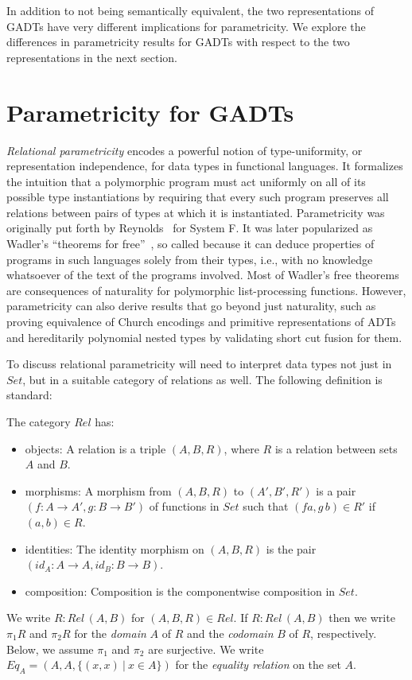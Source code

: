 \documentclass[acmsmall,screen,review,anonymous]{acmart}
\theoremstyle{definition}
\begin{document}
In addition to not being semantically equivalent, the two
representations of GADTs have very different implications for
parametricity. We explore the differences in parametricity results for
GADTs with respect to the two representations in the next section.

\section{Parametricity for GADTs}\label{sec:par}

{\em Relational parametricity} encodes a powerful notion of
type-uniformity, or representation independence, for data types in
functional languages. It formalizes the intuition that a polymorphic
program must act uniformly on all of its possible type instantiations
by requiring that every such program preserves all relations between
pairs of types at which it is instantiated. Parametricity was
originally put forth by Reynolds~\cite{rey83} for System F. It was
later popularized as Wadler's ``theorems for free''~\cite{wad89}, so
called because it can deduce properties of programs in such languages
solely from their types, i.e., with no knowledge whatsoever of the
text of the programs involved.  Most of Wadler's free theorems are
consequences of naturality for polymorphic list-processing
functions. However, parametricity can also derive results that go
beyond just naturality, such as proving equivalence of Church
encodings and primitive representations of ADTs and {\color{blue}
  hereditarily polynomial} nested types by validating short cut fusion
for them.

To discuss relational parametricity will need to interpret data types
not just in $\mathit{Set}$, but in a suitable category of relations as
well. The following definition is standard:
\begin{definition}
  The category $\mathit{Rel}$ has:
  \begin{itemize}
\item objects: A relation is a triple $(A,B,R)$, where $R$ is a
  relation between sets $A$ and $B$.
\item morphisms: A morphism from $(A,B,R)$ to $(A',B',R')$ is a pair
  $(f : A \to A',g : B \to B')$ of functions in $\mathit{Set}$ such
  that $(f a,g\,b) \in R'$ if $(a,b) \in R$.
\item identities: The identity morphism on $(A,B,R)$ is the pair
  $(\mathit{id}_A : A \to A, \mathit{id}_B : B \to B)$.
\item composition: Composition is the componentwise composition in
  $\mathit{Set}$. 
\end{itemize}
\end{definition}
\noindent
We write $R : \mathit{Rel}\,(A,B)$ for $(A,B,R) \in \mathit{Rel}$.  If
$R : \mathit{Rel}\,(A,B)$ then we write $\pi_1 R$ and $\pi_2 R$ for
the {\em domain} $A$ of $R$ and the {\em codomain} $B$ of $R$,
respectively. Below, we assume $\pi_1$ and $\pi_2$ are surjective.  We
write $\mathit{Eq}_A = (A,A,\{(x,x)~|~ x \in A\})$ for the {\em
  equality relation} on the set $A$.
\end{document}
